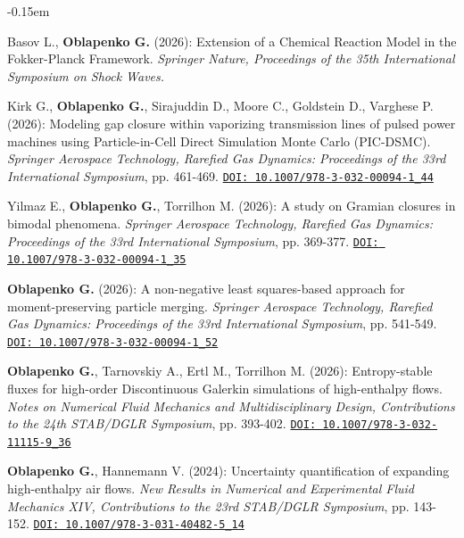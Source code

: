 
\begin{enumerate}
\itemsep-0.15em 

\confitemprsc Basov L., \textbf{Oblapenko G.} (2026): Extension of a Chemical Reaction Model in the Fokker-Planck Framework. \textit{Springer Nature, Proceedings of the 35th International Symposium on Shock Waves. }

\confitemprsc Kirk G., \textbf{Oblapenko G.}, Sirajuddin D., Moore C., Goldstein D., Varghese P. (2026): Modeling gap closure within vaporizing transmission lines of pulsed power machines using Particle-in-Cell Direct Simulation Monte Carlo (PIC-DSMC). \textit{Springer Aerospace Technology, Rarefied Gas Dynamics: Proceedings of the 33rd International Symposium}, pp. 461-469.
\newline\href{https://doi.org/10.1007/978-3-032-00094-1_44}{\texttt{DOI: 10.1007/978-3-032-00094-1\_44}} 

\confitemprsc Yilmaz E., \textbf{Oblapenko G.}, {Torrilhon M.} (2026): A study on Gramian closures in bimodal phenomena. \textit{Springer Aerospace Technology, Rarefied Gas Dynamics: Proceedings of the 33rd International Symposium}, pp. 369-377.
\newline\href{https://doi.org/10.1007/978-3-032-00094-1_35}{\texttt{DOI: 10.1007/978-3-032-00094-1\_35}} 

\confitemprsc \textbf{Oblapenko G.} (2026): A non-negative least squares-based approach for moment-preserving particle merging. \textit{Springer Aerospace Technology, Rarefied Gas Dynamics: Proceedings of the 33rd International Symposium}, pp. 541-549.
\newline\href{https://doi.org/10.1007/978-3-032-00094-1_52}{\texttt{DOI: 10.1007/978-3-032-00094-1\_52}} 

\confitemprsc \textbf{Oblapenko G.}, {Tarnovskiy A.}, {Ertl M.}, {Torrilhon M.} (2026): Entropy-stable fluxes for high-order Discontinuous Galerkin simulations of high-enthalpy flows. \textit{Notes on Numerical Fluid Mechanics and Multidisciplinary Design, Contributions to the 24th STAB/DGLR Symposium}, pp. 393-402.
\newline\href{https://doi.org/10.1007/978-3-032-11115-9_36}{\texttt{DOI: 10.1007/978-3-032-11115-9\_36}}

\confitemprsc \textbf{Oblapenko G.}, Hannemann V. (2024): {Uncertainty quantification of expanding high-enthalpy air flows}. \textit{New Results in Numerical and Experimental Fluid Mechanics XIV, Contributions to the 23rd STAB/DGLR Symposium}, pp. 143-152.\newline
    \href{https://doi.org/10.1007/978-3-031-40482-5_14}{\texttt{DOI: 10.1007/978-3-031-40482-5\_14}}


\end{enumerate}
